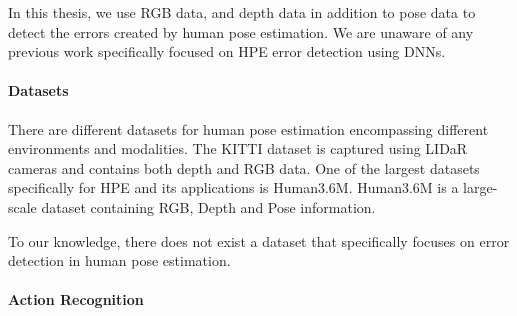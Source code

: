 In this thesis, we use RGB data, and depth data in addition to pose data to detect the errors created by human pose estimation. We are unaware of any previous work specifically focused on HPE error detection using DNNs.

\paragraph{Datasets}

There are different datasets for human pose estimation encompassing different environments and modalities. The KITTI dataset is captured using LIDaR cameras and contains both depth and RGB data\cite{Geiger2012CVPR}. One of the largest datasets specifically for HPE and its applications is Human3.6M\cite{h36m_pami}. Human3.6M is a large-scale dataset containing RGB, Depth and Pose information.

To our knowledge, there does not exist a dataset that specifically focuses on error detection in human pose estimation.

\paragraph{Action Recognition}
